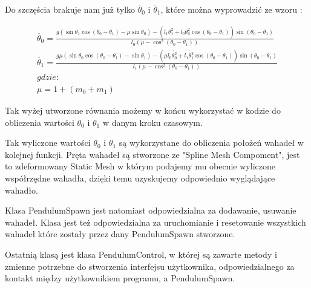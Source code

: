 \documentclass[a4paper,12pt,reqno]{article}
\begin{document}
Do szczęścia brakuje nam już tylko $\ddot{\theta_0}$ i $\ddot{\theta_1}$, które można wyprowadzić ze wzoru \cite{double_pendulum}: 

\begin{equation}
\begin{split} 
\ddot{\theta_0}=\frac{g(\sin\theta_1\cos(\theta_0-\theta_1)-\mu\sin\theta_0)
-(l_1\dot{\theta_1^2}+l_0\dot{\theta_0^2}\cos(\theta_0-\theta_1))\sin(\theta_0-\theta_1)}{l_0(\mu-\cos^2(\theta_0-\theta_1))}
\\
\ddot{\theta_1}=\frac{g\mu(\sin\theta_0\cos(\theta_0-\theta_1)-\sin\theta_1)
-(\mu l_0\dot{\theta_0^2}+l_1\dot{\theta_1^2}\cos(\theta_0-\theta_1))\sin(\theta_0-\theta_1)}
{l_1(\mu-\cos^2(\theta_0-\theta_1))}
\\
gdzie:
\\
\mu=1+(m_0+m_1)
\end{split}
\label{computeAngularAcceleration}
\end{equation}

Tak wyżej utworzone równania możemy w końcu wykorzystać w kodzie do obliczenia wartości $\theta_0$ i $\theta_1$ w danym kroku czasowym.


\label{ComputeTheta}


Tak wyliczone wartości $\theta_0$ i $\theta_1$ są wykorzystane do obliczenia położeń wahadeł w kolejnej funkcji. Pręta wahadeł są stworzone ze "Spline Mesh Compoment", jest to zdeformowany Static Mesh w którym podajemy mu obecnie wyliczone współrzędne wahadła, dzięki temu uzyskujemy odpowiednio wyglądające wahadło.




Klasa PendulumSpawn jest natomiast odpowiedzialna za dodawanie, usuwanie wahadeł. Klasa jest też odpowiedzialna za uruchomianie i resetowanie wszystkich wahadeł które zostały przez dany PendulumSpawn stworzone.

Ostatnią klasą jest klasa PendulumControl, w której są zawarte metody i zmienne potrzebne do stworzenia interfejsu użytkownika, odpowiedzialnego za kontakt między użytkownikiem programu, a PendulumSpawn.
\end{document}
